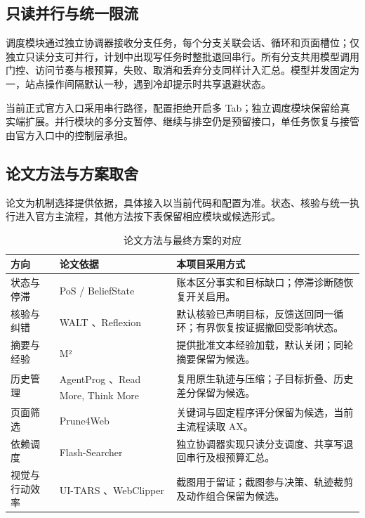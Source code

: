 \documentclass[UTF8,zihao=5,fontset=windows,a4paper]{ctexart}
\newcommand{\citepaper}[1]{\textsuperscript{\textcolor{blue}{\cite{#1}}}}
\begin{document}
\subsection{只读并行与统一限流}

调度模块通过独立协调器接收分支任务，每个分支关联会话、循环和页面槽位；仅独立只读分支可并行，计划中出现写任务时整批退回串行。所有分支共用模型调用门控、访问节奏与根预算，失败、取消和丢弃分支同样计入汇总。模型并发固定为一，站点操作间隔默认一秒，遇到冷却提示时共享退避状态。

当前正式官方入口采用串行路径，配置拒绝开启多 Tab；独立调度模块保留给真实端扩展。并行模块的多分支暂停、继续与排空仍是预留接口，单任务恢复与接管由官方入口中的控制层承担。

\subsection{论文方法与方案取舍}

论文为机制选择提供依据，具体接入以当前代码和配置为准。状态、核验与统一执行进入官方主流程，其他方法按下表保留相应模块或候选形式。

\begin{table}[htbp]
\caption{论文方法与最终方案的对应}\label{tab:methods}
\centering\begingroup
\linespread{1.02}\fontsize{9.5}{14}\selectfont
\renewcommand{\arraystretch}{1.18}
\begin{tabularx}{\linewidth}{@{}L{25mm}L{39mm}Y@{}}
\toprule{}
\textbf{\color{navy}方向} & \textbf{\color{navy}论文依据} & \textbf{\color{navy}本项目采用方式}\\
\midrule
状态与停滞 & PoS / BeliefState \citepaper{pos} & 账本区分事实和目标缺口；停滞诊断随恢复开关启用。\\
核验与纠错 & WALT \citepaper{walt}、Reflexion \citepaper{reflexion} & 默认核验已声明目标，反馈送回同一循环；有界恢复按证据撤回受影响状态。\\
摘要与经验 & M² \citepaper{m2} & 提供批准文本经验加载，默认关闭；同轮摘要保留为候选。\\
历史管理 & AgentProg \citepaper{agentprog}、Read More, Think More \citepaper{readmore} & 复用原生轨迹与压缩；子目标折叠、历史差分保留为候选。\\
页面筛选 & Prune4Web \citepaper{prune} & 关键词与固定程序评分保留为候选，当前主流程读取 AX。\\
依赖调度 & Flash-Searcher \citepaper{flash} & 独立协调器实现只读分支调度、共享写退回串行及根预算汇总。\\
视觉与行动效率 & UI-TARS \citepaper{uitars}、\mbox{WebClipper\citepaper{clipper}} & 截图用于留证；截图参与决策、轨迹裁剪及动作组合保留为候选。\\
\bottomrule
\end{tabularx}
\endgroup\end{table}
\end{document}
